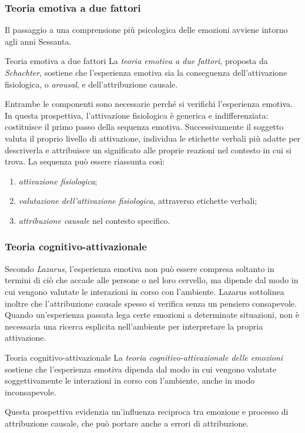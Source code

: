 \documentclass[a4paper]{article}
\begin{document}
\subsubsection{Teoria emotiva a due fattori}
Il passaggio a una comprensione più psicologica delle emozioni avviene intorno agli anni Sessanta.
\begin{snippetdefinition}{Teoria emotiva a due fattori}
    La \emph{teoria emotiva a due fattori}, proposta da \emph{Schachter}, sostiene che l'esperienza emotiva sia la conseguenza dell'attivazione fisiologica, o \emph{arousal}, e dell'attribuzione causale.
\end{snippetdefinition}
Entrambe le componenti sono necessarie perché si verifichi l'esperienza emotiva. In questa prospettiva, l'attivazione fisiologica è generica e indifferenziata: costituisce il primo passo della sequenza emotiva. Successivamente il soggetto valuta il proprio livello di attivazione, individua le etichette verbali più adatte per descriverla e attribuisce un significato alle proprie reazioni nel contesto in cui si trova.
La sequenza può essere riassunta così:
\begin{enumerate}
    \item \emph{attivazione fisiologica};
    \item \emph{valutazione dell'attivazione fisiologica}, attraverso etichette verbali;
    \item \emph{attribuzione causale} nel contesto specifico.
\end{enumerate}
\subsubsection{Teoria cognitivo-attivazionale}
Secondo \emph{Lazarus}, l'esperienza emotiva non può essere compresa soltanto in termini di ciò che accade alle persone o nel loro cervello, ma dipende dal modo in cui vengono valutate le interazioni in corso con l'ambiente.
Lazarus sottolinea inoltre che l'attribuzione causale spesso si verifica senza un pensiero consapevole. Quando un'esperienza passata lega certe emozioni a determinate situazioni, non è necessaria una ricerca esplicita nell'ambiente per interpretare la propria attivazione.
\begin{snippetdefinition}{Teoria cognitivo-attivazionale}
    La \emph{teoria cognitivo-attivazionale delle emozioni} sostiene che l'esperienza emotiva dipenda dal modo in cui vengono valutate soggettivamente le interazioni in corso con l'ambiente, anche in modo inconsapevole.
\end{snippetdefinition}
Questa prospettiva evidenzia un'influenza reciproca tra emozione e processo di attribuzione causale, che può portare anche a errori di attribuzione.
\end{document}
